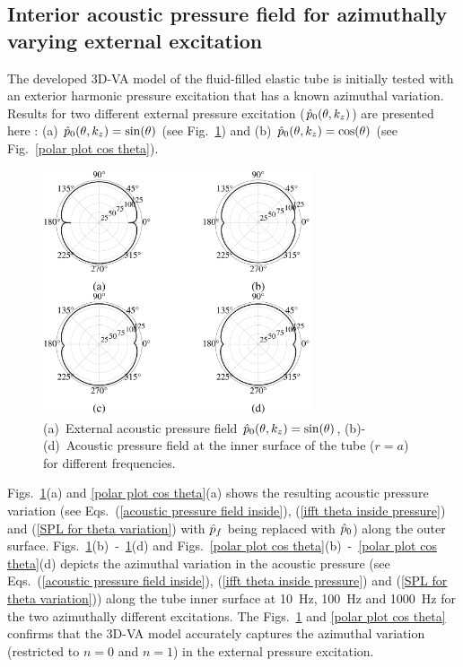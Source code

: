 \documentclass[twocolumn,10pt]{asme2ej}
\begin{document}
\subsection{Interior acoustic pressure field for azimuthally varying external excitation}
\label{azimuthal excitation}
The developed 3D-VA model of the fluid-filled elastic tube is initially tested with an exterior harmonic pressure excitation that has a known azimuthal variation. Results for two different external pressure excitation ($\Hat{p}_0(\theta,k_z)$) are presented here : (a) $\Hat{p}_0(\theta,k_z) = \sin(\theta)$ (see Fig.~\ref{polar plot sin theta}) and (b) $\Hat{p}_0(\theta,k_z) = \cos(\theta)$ (see Fig.~\ref{polar plot cos theta}).


\begin{figure}[h]
    \centering
    \includegraphics[width=3.1in]{figure/polarplot_sin(theta).eps}
    \caption{(a)~External acoustic pressure field $\Hat{p}_0(\theta,k_z) =\sin(\theta)$, (b)-(d)~Acoustic pressure field at the inner surface of the tube ($r=a$) for different frequencies.}
    \label{polar plot sin theta}
\end{figure}

Figs.~\ref{polar plot sin theta}(a) and \ref{polar plot cos theta}(a) shows the resulting acoustic pressure variation (see Eqs.~(\ref{acoustic pressure field inside}), (\ref{ifft theta inside pressure}) and (\ref{SPL for theta variation}) with $\Hat{p}_f$ being replaced with $\Hat{p}_0$) along the outer surface. Figs.~\ref{polar plot sin theta}(b)~-~\ref{polar plot sin theta}(d) and Figs.~\ref{polar plot cos theta}(b)~-~\ref{polar plot cos theta}(d) depicts the azimuthal variation in the acoustic pressure (see Eqs.~(\ref{acoustic pressure field inside}), (\ref{ifft theta inside pressure}) and (\ref{SPL for theta variation})) along the tube inner surface at 10~Hz, 100~Hz and 1000~Hz for the two azimuthally different excitations. The Figs.~\ref{polar plot sin theta} and \ref{polar plot cos theta} confirms that the 3D-VA model accurately captures the azimuthal variation (restricted to $n=0$ and $n=1$) in the external pressure excitation.
\end{document}
